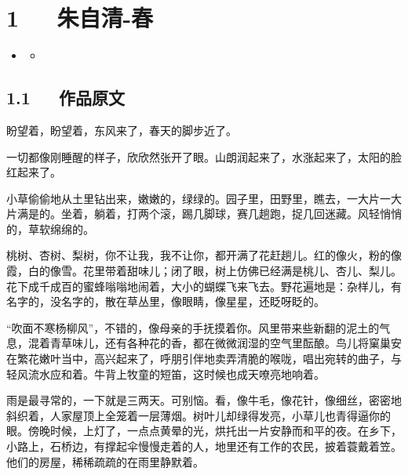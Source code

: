 \documentclass[letterpaper,10pt,english]{sphinxmanual}
\begin{document}
\chapter{1   朱自清-春}
\label{\detokenize{p01_u6563_u6587/_u6731_u81ea_u6e05-_u6625:id1}}\label{\detokenize{p01_u6563_u6587/_u6731_u81ea_u6e05-_u6625::doc}}
\begin{sphinxShadowBox}
\begin{itemize}
\item {} 
\label{\detokenize{p01_u6563_u6587/_u6731_u81ea_u6e05-_u6625:id4}}{\hyperref[\detokenize{p01_u6563_u6587/_u6731_u81ea_u6e05-_u6625:id1}]{}}
\begin{itemize}
\item {} 
\label{\detokenize{p01_u6563_u6587/_u6731_u81ea_u6e05-_u6625:id5}}{\hyperref[\detokenize{p01_u6563_u6587/_u6731_u81ea_u6e05-_u6625:id3}]{}}

\end{itemize}

\end{itemize}
\end{sphinxShadowBox}


\section{1.1   作品原文}
\label{\detokenize{p01_u6563_u6587/_u6731_u81ea_u6e05-_u6625:id3}}
盼望着，盼望着，东风来了，春天的脚步近了。

一切都像刚睡醒的样子，欣欣然张开了眼。山朗润起来了，水涨起来了，太阳的脸红起来了。

小草偷偷地从土里钻出来，嫩嫩的，绿绿的。园子里，田野里，瞧去，一大片一大片满是的。坐着，躺着，打两个滚，踢几脚球，赛几趟跑，捉几回迷藏。风轻悄悄的，草软绵绵的。

桃树、杏树、梨树，你不让我，我不让你，都开满了花赶趟儿。红的像火，粉的像霞，白的像雪。花里带着甜味儿；闭了眼，树上仿佛已经满是桃儿、杏儿、梨儿。花下成千成百的蜜蜂嗡嗡地闹着，大小的蝴蝶飞来飞去。野花遍地是：杂样儿，有名字的，没名字的，散在草丛里，像眼睛，像星星，还眨呀眨的。

“吹面不寒杨柳风”，不错的，像母亲的手抚摸着你。风里带来些新翻的泥土的气息，混着青草味儿，还有各种花的香，都在微微润湿的空气里酝酿。鸟儿将窠巢安在繁花嫩叶当中，高兴起来了，呼朋引伴地卖弄清脆的喉咙，唱出宛转的曲子，与轻风流水应和着。牛背上牧童的短笛，这时候也成天嘹亮地响着。

雨是最寻常的，一下就是三两天。可别恼。看，像牛毛，像花针，像细丝，密密地斜织着，人家屋顶上全笼着一层薄烟。树叶儿却绿得发亮，小草儿也青得逼你的眼。傍晚时候，上灯了，一点点黄晕的光，烘托出一片安静而和平的夜。在乡下，小路上，石桥边，有撑起伞慢慢走着的人，地里还有工作的农民，披着蓑戴着笠。他们的房屋，稀稀疏疏的在雨里静默着。
\end{document}
